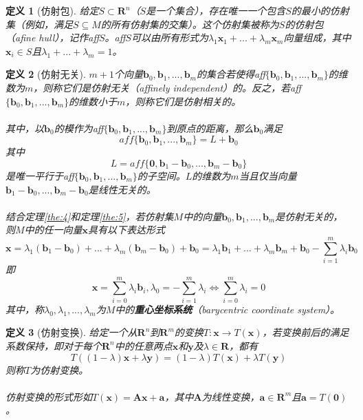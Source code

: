 \documentclass[a4paper,11pt,oneside]{article}
\newtheorem{definition}{定义}[section]
\begin{document}
			\begin{definition}[仿射包]
				\label{def:11}
				给定$S \subset \textbf{R}^{n}$（$S$是一个集合），存在唯一一个包含$S$的最小的仿射集（例如，满足$S \subseteq M$的所有仿射集的交集）。这个仿射集被称为$S$的仿射包（afine hull），记作aff$S$。aff$S$可以由所有形式为$\lambda_{1}\textbf{x}_{1}+...+\lambda_{m}\textbf{x}_{m}$向量组成，其中$\textbf{x}_{i} \in S$且$\lambda_{1}+...+\lambda_{m}=1$。
			\end{definition}
			\begin{definition}[仿射无关]
				$m+1$个向量$\textbf{b}_{0},\textbf{b}_{1},...,\textbf{b}_{m}$的集合若使得aff$\{\textbf{b}_{0},\textbf{b}_{1},...,\textbf{b}_{m}\}$的维数为$m$，则称它们是仿射无关（affinely independent）的。反之，若aff$\{\textbf{b}_{0},\textbf{b}_{1},...,\textbf{b}_{m}\}$的维数小于$m$，则称它们是仿射相关的。\\
				\\
				其中，以$\textbf{b}_{0}$的模作为aff$\{\textbf{b}_{0},\textbf{b}_{1},...,\textbf{b}_{m}\}$到原点的距离，那么$\textbf{b}_{0}$满足
				$$aff\{\textbf{b}_{0},\textbf{b}_{1},...,\textbf{b}_{m}\}=L+\textbf{b}_{0}$$
				其中
				$$L=aff\{\textbf{0},\textbf{b}_{1}-\textbf{b}_{0},...,\textbf{b}_{m}-\textbf{b}_{0}\}$$
				是唯一平行于aff$\{\textbf{b}_{0},\textbf{b}_{1},...,\textbf{b}_{m}\}$的子空间。$L$的维数为$m$当且仅当向量$\textbf{b}_{1}-\textbf{b}_{0},...,\textbf{b}_{m}-\textbf{b}_{0}$是线性无关的。\\
				\\
				结合定理\ref{the:4}和定理\ref{the:5}，若仿射集$M$中的向量$\textbf{b}_{0},\textbf{b}_{1},...,\textbf{b}_{m}$是仿射无关的，则$M$中的任一向量$\textbf{x}$具有以下表达形式
				$$\textbf{x}=\lambda_{1}(\textbf{b}_{1}-\textbf{b}_{0})+...+\lambda_{m}(\textbf{b}_{m}-\textbf{b}_{0})+\textbf{b}_{0} = \lambda_{1}\textbf{b}_{1}+...+\lambda_{m}\textbf{b}_{m}+\textbf{b}_{0}-\sum_{i=1}^{m}\lambda_{i}\textbf{b}_{0}$$
				即
				$$\textbf{x}=\sum_{i=0}^{m}\lambda_{i}\textbf{b}_{i}, \lambda_{0}=-\sum_{i=1}^{m}\lambda_{i} \Leftrightarrow \sum_{i=0}^{m}\lambda_{i}=0$$
				其中，称$\lambda_{0},\lambda_{1},...,\lambda_{m}$为$M$中的\textbf{重心坐标系统}（barycentric coordinate system）。
			\end{definition}
			\begin{definition}[仿射变换]
				\label{def:13}
				给定一个从$\textbf{R}^{n}$到$\textbf{R}^{m}$的变换$T:\textbf{x} \rightarrow T(\textbf{x})$，若变换前后的满足系数保持，即对于每个$\textbf{R}^{n}$中的任意两点$\textbf{x}$和$\textbf{y}$及$\lambda \in \textbf{R}$，都有
				$$T((1-\lambda)\textbf{x}+\lambda\textbf{y})=(1-\lambda)T(\textbf{x})+\lambda T(\textbf{y})$$
				则称$T$为仿射变换。\\
				\\
				仿射变换的形式形如$T(\textbf{x})=\textbf{A}\textbf{x}+\textbf{a}$，其中$\textbf{A}$为线性变换，$\textbf{a}\in \textbf{R}^{m}$且$\textbf{a}=T(\textbf{0})$。
			\end{definition}
\end{document}
